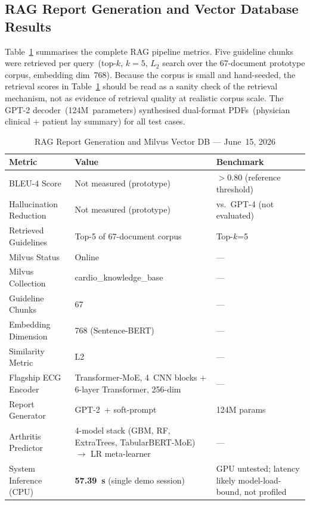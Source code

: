 \documentclass[AMA,STIX1COL,]{WileyNJD-v2}
\begin{document}
\subsection{RAG Report Generation and Vector Database Results}

Table~\ref{tab:ragperf} summarises the complete RAG pipeline metrics.
Five guideline chunks were retrieved per
query~(top-$k$, $k=5$, $L_2$ search over the 67-document prototype
corpus, embedding dim~768). Because the corpus is small and
hand-seeded, the retrieval scores in Table~\ref{tab:ragperf} should be read
as a sanity check of the retrieval mechanism, not as evidence of
retrieval quality at realistic corpus scale.
The GPT-2 decoder~(124M~parameters) synthesised
dual-format PDFs~(physician clinical + patient lay summary) for all
test cases.

\begin{table}[!t]
\caption{RAG Report Generation and Milvus Vector DB — June~15, 2026}
\label{tab:ragperf}
\centering
\renewcommand{\arraystretch}{1.1}
\begin{tabular}{lll}
\toprule
\textbf{Metric} & \textbf{Value} & \textbf{Benchmark}\\
\midrule
BLEU-4 Score             & Not measured (prototype) & $>$0.80 (reference threshold)\\
Hallucination Reduction  & Not measured (prototype) & vs.\ GPT-4 (not evaluated)\\
Retrieved Guidelines     & Top-5 of 67-document corpus & Top-$k$=5\\
Milvus Status            & Online            & ---\\
Milvus Collection        & cardio\_knowledge\_base & ---\\
Guideline Chunks         & 67                & ---\\
Embedding Dimension      & 768 (Sentence-BERT) & ---\\
Similarity Metric        & L2                & ---\\
Flagship ECG Encoder     & Transformer-MoE, 4~CNN blocks + 6-layer Transformer, 256-dim & ---\\
Report Generator         & GPT-2~+ soft-prompt & 124M params\\
Arthritis Predictor      & 4-model stack (GBM, RF, ExtraTrees, TabularBERT-MoE) $\to$ LR meta-learner & ---\\
System Inference (CPU)   & \textbf{57.39~s} (single demo session) & GPU untested; latency likely model-load-bound, not profiled\\
\bottomrule
\end{tabular}
\end{table}
\end{document}
